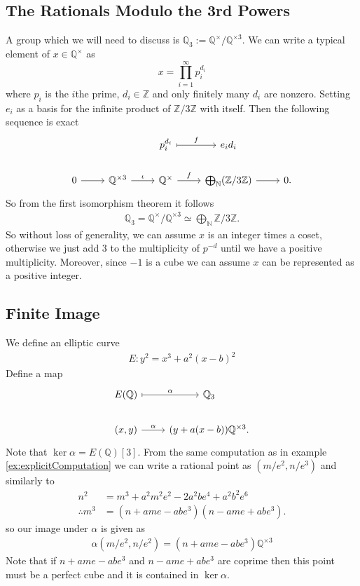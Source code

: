 \subsection{The Rationals Modulo the 3rd Powers}%
\label{sub:the_rationals_modulo_the_3rd_powers}
A group which we will need to discuss is $\mathbb{Q}_3 := \mathbb{Q}^{\times}/\mathbb{Q}^{\times 3}$.
We can write a typical element of $x \in \mathbb{Q}^{\times}$
as
\[ x = \prod_{i=1}^{\infty} p_i^{d_i} \]
where $p_i$ is the $i$the prime, $d_i \in \mathbb{Z}$ and only finitely
many $d_i$ are nonzero.
Setting $e_i$ as a basis for the infinite product of $\mathbb{Z}/3\mathbb{Z}$
with itself.
Then the following sequence is exact
\begin{equation*}
\begin{tikzcd}
  & & p_i^{d_i} \ar[r, mapsto, "f"] & e_i d_i \\
  0 \ar[r] & \mathbb{Q}^{\times 3} \ar[r, "\iota"] &\mathbb{Q}^{\times} \ar[r, "f"] & \bigoplus_{\mathbb{N}} (\mathbb{Z}/3\mathbb{Z}) \ar[r] & 0.
\end{tikzcd}
\end{equation*}
So from the first isomorphism theorem it follows
\begin{align*}
  \mathbb{Q}_{3} = \mathbb{Q}^{\times} / \mathbb{Q}^{\times 3} \simeq \bigoplus_{\mathbb{N}} \mathbb{Z}/3\mathbb{Z}.
\end{align*}
So without loss of generality, we can assume $x$ is an integer times a
coset, otherwise we just add $3$ to the multiplicity of
$p^{-d}$ until we have a positive multiplicity. Moreover,
since $-1$ is a cube we can assume $x$ can be represented as a positive
integer.

\subsection{Finite Image}%
\label{sub:finite_image}
We define an elliptic curve
\begin{align*}
  E: y^2 = x^3 + a^2(x - b)^2
\end{align*}
Define a map
\begin{equation*}
\begin{tikzcd}
  E(\mathbb{Q}) \ar[r, mapsto, "\alpha"] & \mathbb{Q}_3 \\
  (x, y) \ar[r, "\alpha"] & (y + a(x - b)) \mathbb{Q}^{\times 3}.
\end{tikzcd}
\end{equation*}
Note that $\ker \alpha = E(\mathbb{Q})[3]$.
From the same computation as in example \ref{ex:explicitComputation}
we can write a rational point as $(m/e^2, n/e^3)$ and
similarly to \cite[Section 4.1]{moniqueThesis}
\begin{align*}
  n^2 &= m^3 + a^2 m^2 e^2 - 2a^2 b e^{4} + a^2 b^2 e^{6} \\
  \therefore m^3 &= (n + ame - abe^3)(n - ame + abe^3).
\end{align*}
so our image under $\alpha$ is given as
\begin{align*}
  \alpha(m/e^2, n/e^2) = (n + ame - abe^3)\mathbb{Q}^{\times 3}
\end{align*}
Note that if $n + ame - abe^3$ and $n - ame + abe^3$
are coprime then this point must be a perfect cube and it is
contained in $\ker \alpha$.


